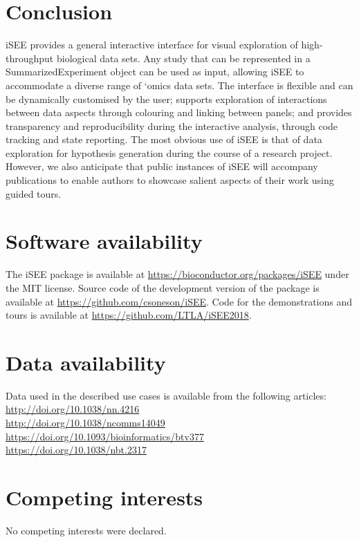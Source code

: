\documentclass[10pt,a4paper,twocolumn]{article}
\begin{document}
\section*{Conclusion}
iSEE provides a general interactive interface for visual exploration of high-throughput biological data sets.
Any study that can be represented in a SummarizedExperiment object can be used as input, allowing iSEE to accommodate a diverse range of `omics data sets.
The interface is flexible and can be dynamically customised by the user; supports exploration of interactions between data aspects through colouring and linking between panels;
and provides transparency and reproducibility during the interactive analysis, through code tracking and state reporting.
The most obvious use of iSEE is that of data exploration for hypothesis generation during the course of a research project.
However, we also anticipate that public instances of iSEE will accompany publications to enable authors to showcase salient aspects of their work using guided tours.

\section*{Software availability}
The iSEE package is available at \url{https://bioconductor.org/packages/iSEE} under the MIT license.
Source code of the development version of the package is available at \url{https://github.com/csoneson/iSEE}.
Code for the demonstrations and tours is available at \url{https://github.com/LTLA/iSEE2018}.

\section*{Data availability }
Data used in the described use cases is available from the following articles: \\
\url{http://doi.org/10.1038/nn.4216}\citep{tasic2016allen} \\
\url{http://doi.org/10.1038/ncomms14049}\citep{zheng2017massively} \\
\url{https://doi.org/10.1093/bioinformatics/btv377}\citep{piccolo2015TCGA} \\
\url{https://doi.org/10.1038/nbt.2317}\citep{bodenmiller2012cytof} \\

\section*{Competing interests}
No competing interests were declared.
\end{document}
